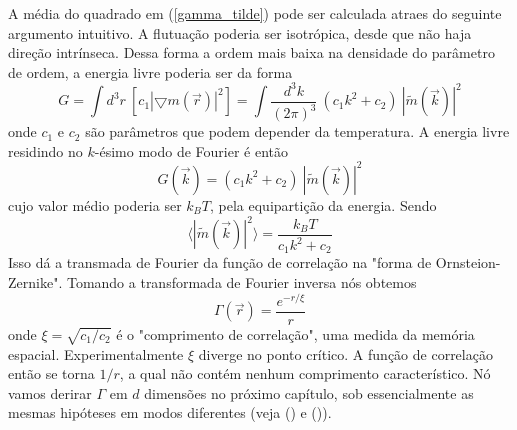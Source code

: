 A média do quadrado em (\ref{gamma_tilde}) pode ser calculada atraes do seguinte argumento intuitivo. A flutuação poderia ser isotrópica, desde que não haja direção intrínseca. Dessa forma a ordem mais baixa na densidade do parâmetro de ordem, a energia livre poderia ser da forma
\begin{equation}
G=\int d^{3}r~\left[c_{1} |\bigtriangledown m(\vec{r})|^{2}\right]= \int \frac{d^{3}k}{(2 \pi)^{3}}~(c_{1}k^{2}+c_{2})~|\tilde{m}(\vec{k})|^{2}
\end{equation}
onde $c_{1}$ e $c_{2}$ são parâmetros que podem depender da temperatura. A energia livre residindo no $k$-ésimo modo de Fourier é então
\begin{equation}
G(\vec{k})=(c_{1}k^{2}+c_{2})~|\tilde{m}(\vec{k})|^{2}
\end{equation}
cujo valor médio poderia ser $k_{B}T$, pela equipartição da energia. Sendo
\begin{equation}
\langle |\tilde{m}(\vec{k})|^{2} \rangle = \frac{k_{B}T}{c_{1}k^{2}+c_{2}}
\end{equation}
Isso dá a transmada de Fourier da função de correlação na "forma de Ornsteion-Zernike". Tomando a transformada de Fourier inversa nós obtemos
\begin{equation}
\Gamma(\vec{r})=\frac{e^{-r/\xi}}{r}
\end{equation}
onde $\xi=\sqrt{c_{1}/c_{2}}$ é o "comprimento de correlação", uma medida da memória espacial. Experimentalmente $\xi$ diverge no ponto crítico. A função de correlação então se torna $1/r$, a qual não contém nenhum comprimento característico. Nó vamos derirar $\Gamma$ em $d$ dimensões no próximo capítulo, sob essencialmente as mesmas hipóteses em modos diferentes (veja () e ()).

